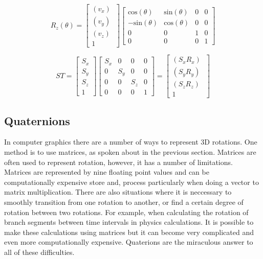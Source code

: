 \begin{equation}
R_z(\theta) = 
\begin{bmatrix}
(v_x)~ \\
(v_y)~ \\
(v_z)~ \\
1
\end{bmatrix}
\begin{bmatrix}
\text{cos}(\theta) 	& \text{sin}(\theta) 	& 0						& 0\\
-\text{sin}(\theta) & \text{cos}(\theta) 	& 0
					& 0\\
0 					& 0 					& 1						& 0\\
0 					& 0 					& 0 					& 1
\end{bmatrix}
\end{equation}


\begin{equation}
ST = \begin{bmatrix}
S_{x} \\
S_{y} \\
S_{z} \\
1
\end{bmatrix}
\begin{bmatrix}
S_x & 0 & 0 & 0\\
0 & S_y & 0 & 0\\
0 & 0 & S_z & 0\\
0  & 0  & 0 & 1
\end{bmatrix}
= \begin{bmatrix}
(S_x R_x)~ \\
(S_y R_y)~ \\
(S_z R_z)~ \\
1
\end{bmatrix}
\end{equation}

\subsection{Quaternions}

In computer graphics there are a number of ways to represent 3D rotations. One method is to use matrices, as spoken about in the previous section. Matrices are often used to represent rotation, however, it has a number of limitations. Matrices are represented by nine floating point values and can be computationally expensive store and, process particularly when doing a vector to matrix multiplication. There are also situations where it is neccessary to smoothly transition from one rotation to another, or find a certain degree of rotation between two rotations. For example, when calculating the rotation of branch segments between time intervals in physics calculations. It is possible to make these calculations using matrices but it can become very complicated and even more computationally expensive. Quaterions are the miraculous answer to all of these difficulties.\\

